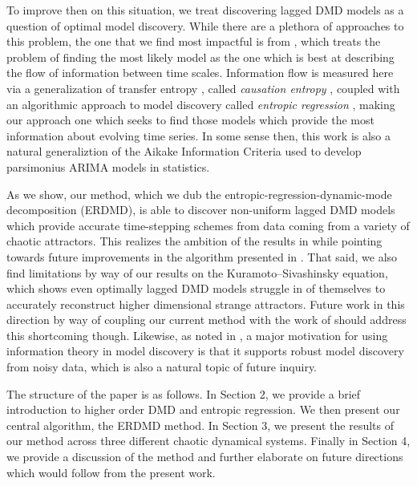 \documentclass[a4paper,11pt]{article}
\begin{document}
To improve then on this situation, we treat discovering lagged DMD models as a question of optimal model discovery.  While there are a plethora of approaches to this problem, the one that we find most impactful is from \cite{bollt2}, which treats the problem of finding the most likely model as the one which is best at describing the flow of information between time scales.  Information flow is measured here via a generalization of transfer entropy \cite{schreiber}, called {\it causation entropy} \cite{bollt}, coupled with an algorithmic approach to model discovery called {\it entropic regression} \cite{bollt2}, making our approach one which seeks to find those models which provide the most information about evolving time series.  In some sense then, this work is also a natural generaliztion of the Aikake Information Criteria \cite{aikake} used to develop parsimonius ARIMA models in statistics.  

As we show, our method, which we dub the entropic-regression-dynamic-mode decomposition (ERDMD), is able to discover non-uniform lagged DMD models which provide accurate time-stepping schemes from data coming from a variety of chaotic attractors.  This realizes the ambition of the results in \cite{arbabi} while pointing towards future improvements in the algorithm presented in \cite{curtis_dldmd}.  That said, we also find limitations by way of our results on the Kuramoto--Sivashinsky equation, which shows even optimally lagged DMD models struggle in of themselves to accurately reconstruct higher dimensional strange attractors.  Future work in this direction by way of coupling our current method with the work of \cite{curtis_dldmd} should address this shortcoming though.  Likewise, as noted in \cite{bollt2}, a major motivation for using information theory in model discovery is that it supports robust model discovery from noisy data, which is also a natural topic of future inquiry.  

The structure of the paper is as follows.  In Section 2, we provide a brief introduction to higher order DMD and entropic regression.  We then present our central algorithm, the ERDMD method.  In Section 3, we present the results of our method across three different chaotic dynamical systems.  Finally in Section 4, we provide a discussion of the method and further elaborate on future directions which would follow from the present work.   

\end{document}

